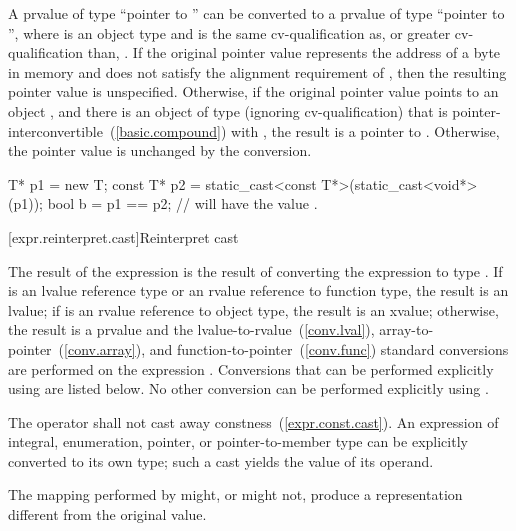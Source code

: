\pnum
A prvalue of type ``pointer to  '' can be
converted to a prvalue of type ``pointer to  '',
where  is an object type and  is the same
cv-qualification as, or greater cv-qualification than, .
If the original pointer value represents the address
 of a byte in memory and
 does not satisfy the alignment requirement of ,
then the resulting pointer value is unspecified.
Otherwise, if the original pointer value points to an object ,
and there is an object  of type  (ignoring cv-qualification)
that is pointer-interconvertible~(\ref{basic.compound}) with ,
the result is a pointer to .
Otherwise, the pointer value is unchanged by the conversion. 
\begin{example}

\begin{codeblock}
T* p1 = new T;
const T* p2 = static_cast<const T*>(static_cast<void*>(p1));
bool b = p1 == p2;  //  will have the value .
\end{codeblock}
\end{example}

[expr.reinterpret.cast]{Reinterpret cast}

\pnum
{}%
%
The result of the expression  is the
result of converting the expression  to type .
%
%
If  is an lvalue reference type or an rvalue reference to function type, the result is an lvalue;
if  is an rvalue reference to object type, the result is an xvalue;
otherwise, the result is a prvalue and the
lvalue-to-rvalue~(\ref{conv.lval}), array-to-pointer~(\ref{conv.array}),
and function-to-pointer~(\ref{conv.func}) standard conversions are
performed on the expression . Conversions that can be performed explicitly
using  are listed below. No other conversion can
be performed explicitly using .

\pnum
The  operator shall not cast away constness~(\ref{expr.const.cast}).
An expression of integral, enumeration, pointer, or pointer-to-member type
can be explicitly converted to its own type; such a cast yields the value of
its operand.

\pnum
\begin{note}
The mapping performed by  might, or might not, produce a
representation different from the original value.
\end{note}

